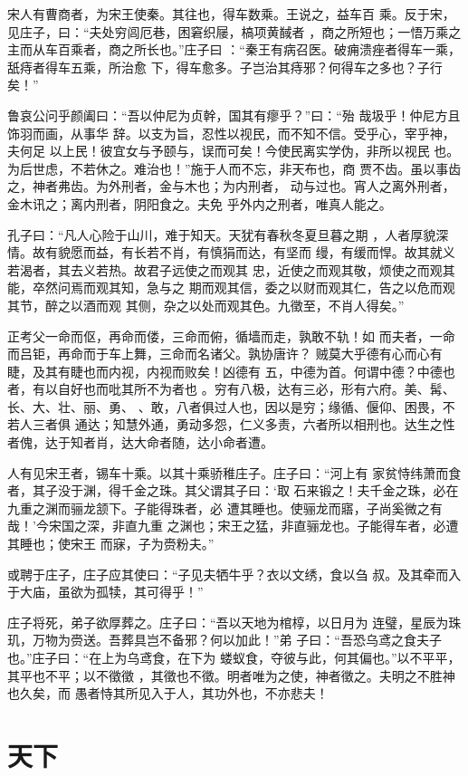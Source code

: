 \documentclass[12pt,UTF8]{ctexbook}
\begin{document}
宋人有曹商者，为宋王使秦。其往也，得车数乘。王说之，益车百 乘。反于宋，见庄子，曰：“夫处穷闾厄巷，困窘织屦，槁项黄馘者 ，商之所短也；一悟万乘之主而从车百乘者，商之所长也。”庄子曰 ：“秦王有病召医。破痈溃痤者得车一乘，舐痔者得车五乘，所治愈 下，得车愈多。子岂治其痔邪？何得车之多也？子行矣！”

鲁哀公问乎颜阖曰：“吾以仲尼为贞幹，国其有瘳乎？”曰：“殆 哉圾乎！仲尼方且饰羽而画，从事华 辞。以支为旨，忍性以视民，而不知不信。受乎心，宰乎神，夫何足 以上民！彼宜女与予颐与，误而可矣！今使民离实学伪，非所以视民 也。为后世虑，不若休之。难治也！”施于人而不忘，非天布也，商 贾不齿。虽以事齿之，神者弗齿。为外刑者，金与木也；为内刑者， 动与过也。宵人之离外刑者，金木讯之；离内刑者，阴阳食之。夫免 乎外内之刑者，唯真人能之。

孔子曰：“凡人心险于山川，难于知天。天犹有春秋冬夏旦暮之期 ，人者厚貌深情。故有貌愿而益，有长若不肖，有慎狷而达，有坚而 缦，有缓而悍。故其就义若渴者，其去义若热。故君子远使之而观其 忠，近使之而观其敬，烦使之而观其能，卒然问焉而观其知，急与之 期而观其信，委之以财而观其仁，告之以危而观其节，醉之以酒而观 其侧，杂之以处而观其色。九徵至，不肖人得矣。”

正考父一命而伛，再命而偻，三命而俯，循墙而走，孰敢不轨！如 而夫者，一命而吕钜，再命而于车上舞，三命而名诸父。孰协唐许？ 贼莫大乎德有心而心有睫，及其有睫也而内视，内视而败矣！凶德有 五，中德为首。何谓中德？中德也者，有以自好也而吡其所不为者也 。穷有八极，达有三必，形有六府。美、髯、长、大、壮、丽、勇、 、敢，八者俱过人也，因以是穷；缘循、偃仰、困畏，不若人三者俱 通达；知慧外通，勇动多怨，仁义多责，六者所以相刑也。达生之性 者傀，达于知者肖，达大命者随，达小命者遭。

人有见宋王者，锡车十乘。以其十乘骄稚庄子。庄子曰：“河上有 家贫恃纬萧而食者，其子没于渊，得千金之珠。其父谓其子曰：‘取 石来锻之！夫千金之珠，必在九重之渊而骊龙颔下。子能得珠者，必 遭其睡也。使骊龙而寤，子尚奚微之有哉！’今宋国之深，非直九重 之渊也；宋王之猛，非直骊龙也。子能得车者，必遭其睡也；使宋王 而寐，子为赍粉夫。”

或聘于庄子，庄子应其使曰：“子见夫牺牛乎？衣以文绣，食以刍 叔。及其牵而入于大庙，虽欲为孤犊，其可得乎！”

庄子将死，弟子欲厚葬之。庄子曰：“吾以天地为棺椁，以日月为 连璧，星辰为珠玑，万物为赍送。吾葬具岂不备邪？何以加此！”弟 子曰：“吾恐乌鸢之食夫子也。”庄子曰：“在上为乌鸢食，在下为 蝼蚁食，夺彼与此，何其偏也。”以不平平，其平也不平；以不徵徵 ，其徵也不徵。明者唯为之使，神者徵之。夫明之不胜神也久矣，而 愚者恃其所见入于人，其功外也，不亦悲夫！
\section{天下}
\end{document}
